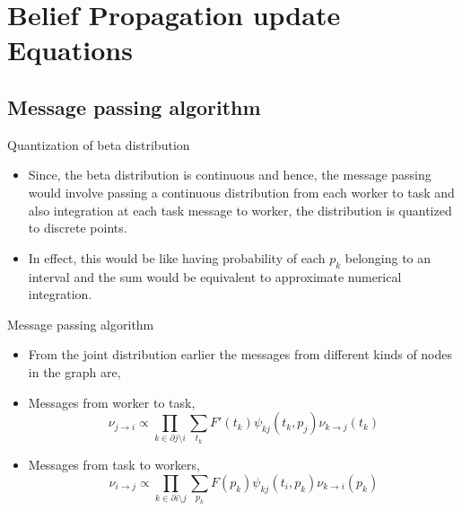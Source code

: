 \documentclass{beamer}
\begin{document}

\section{Belief Propagation update Equations}
\subsection{Message passing algorithm}

\begin{frame}{Quantization of beta distribution}
    \begin{itemize}
    \item {
    Since, the beta distribution is continuous and hence, the message passing would involve passing a continuous distribution from each worker to task and also integration at each task message to worker, the distribution is quantized to discrete points.
    }
    \item {
    In effect, this would be like having probability of each $p_k$ belonging to an interval and the sum would be equivalent to approximate numerical integration.
    }
    \end{itemize}
\end{frame}

\begin{frame}{Message passing algorithm}
  \begin{itemize}
  \item {
  From the joint distribution earlier the messages from different kinds of nodes in the graph are,
  }
  \item {
  Messages from worker to task,
  $$\nu_{j\rightarrow i}\propto\prod_{k\in \partial j\setminus i}\sum_{t_k}F'(t_k)\psi_{kj}(t_k, p_j)\nu_{k\rightarrow j}(t_k)$$
  }
  \item {
  Messages from task to workers,
  $$\nu_{i\rightarrow j}\propto\prod_{k\in \partial i\setminus j}\sum_{p_k}F(p_k)\psi_{kj}(t_i, p_k)\nu_{k\rightarrow i}(p_k)$$
  }
  \end{itemize}
\end{frame}
\end{document}
